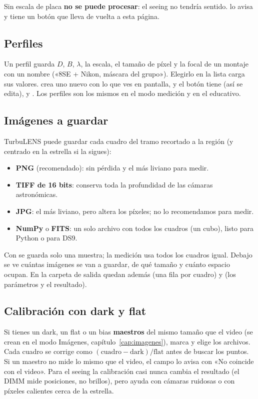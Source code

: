Sin escala de placa \textbf{no se puede procesar}: el seeing no tendría sentido.  lo avisa y tiene un
botón que lleva de vuelta a esta página.

\subsection{Perfiles}

Un perfil guarda $D$, $B$, $\lambda$, la escala, el tamaño de píxel y la focal de un montaje con un nombre («8SE + Nikon,
máscara del grupo»). Elegirlo en la lista carga sus valores.  crea uno nuevo con lo que ves en
pantalla, y el botón  tiene  (así se edita),  y
. Los perfiles son los mismos en el modo medición y en el educativo.

\subsection{Imágenes a guardar}

TurbuLENS puede guardar cada cuadro del tramo recortado a la región (y centrado en la estrella si la sigues):
\begin{itemize}
\item \textbf{PNG} (recomendado): sin pérdida y el más liviano para medir.
\item \textbf{TIFF de 16 bits}: conserva toda la profundidad de las cámaras astronómicas.
\item \textbf{JPG}: el más liviano, pero altera los píxeles; no lo recomendamos para medir.
\item \textbf{NumPy} o \textbf{FITS}: un solo archivo con todos los cuadros (un cubo), listo para Python o para DS9.
\end{itemize}
Con  se guarda solo una muestra; la medición usa todos los cuadros igual. Debajo
se ve cuántas imágenes se van a guardar, de qué tamaño y cuánto espacio ocupan. En la carpeta de salida quedan además
 (una fila por cuadro) y  (los parámetros y el resultado).

\subsection{Calibración con dark y flat}

Si tienes un dark, un flat o un bias \textbf{maestros} del mismo tamaño que el video (se crean en el modo Imágenes,
capítulo~\ref{cap:imagenes}), marca  y elige los archivos.
Cada cuadro se corrige como $(\text{cuadro} - \text{dark}) / \text{flat}$ antes de buscar los puntos. Si un maestro no
mide lo mismo que el video, el campo lo avisa con «No coincide con el video». Para el seeing la calibración casi nunca
cambia el resultado (el DIMM mide posiciones, no brillos), pero ayuda con cámaras ruidosas o con píxeles calientes cerca
de la estrella.

